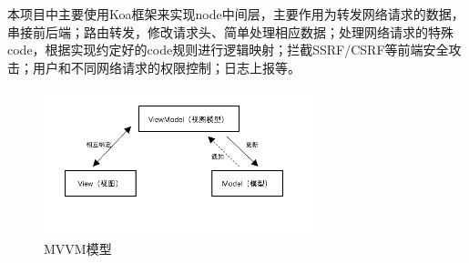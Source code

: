 本项目中主要使用Koa框架来实现node中间层，主要作用为转发网络请求的数据，串接前后端；路由转发，修改请求头、简单处理相应数据；处理网络请求的特殊code，根据实现约定好的code规则进行逻辑映射；拦截SSRF/CSRF等前端安全攻击；用户和不同网络请求的权限控制；日志上报等。
\begin{figure}[H]
    \centering
    \includegraphics[width=0.7\textwidth]{./Chapters/images/mvvm.png} %
    \caption{MVVM模型} %
    \label{MVVM模型} %
\end{figure}
